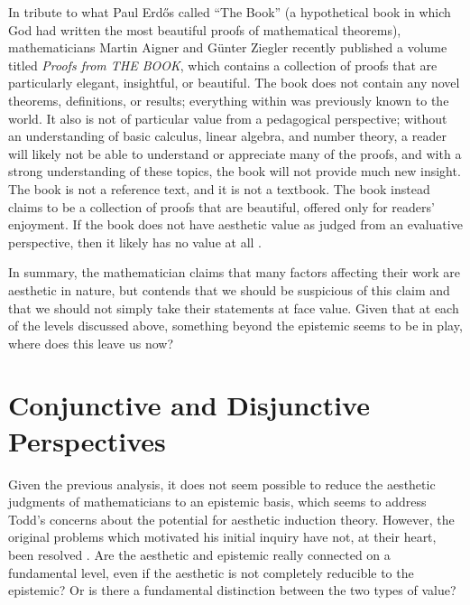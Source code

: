 \documentclass[a4paper,man,natbib]{apa6}
\begin{document}
In tribute to what Paul Erdős called ``The Book'' (a hypothetical book in which God had written the most beautiful proofs
of mathematical theorems), mathematicians Martin Aigner and Günter Ziegler recently published a volume titled \textit{Proofs 
from THE BOOK},
which contains a collection of proofs that are particularly elegant, insightful, or beautiful. The book does not contain
any novel theorems, definitions, or results; everything within was previously known to the world. It also is not of 
particular value
from a pedagogical perspective; without an understanding of basic calculus, linear algebra, and number theory, a reader 
will likely not be able to understand or appreciate many of the proofs, and with a strong understanding of these topics,
the book will not provide much new insight. The book is not a reference text, and it is not a textbook. The book instead
claims to be a collection of proofs that are beautiful, offered only for readers' enjoyment. If the book does not
have aesthetic value as judged from an evaluative perspective, then it likely has no value at all \citep{aigner1999proofs}.

In summary, the mathematician claims that many factors affecting their work are aesthetic in nature, but \cite{todd_unmasking_2008} 
contends that we should be suspicious of this claim and that we should not simply take their statements at face value. 
Given that at each of the levels discussed above, something beyond the epistemic seems to be in play, where does this 
leave us now?

\section{Conjunctive and Disjunctive Perspectives}

Given the previous analysis, it does not seem possible to reduce the aesthetic judgments of mathematicians to
an epistemic basis, which seems to address Todd's concerns about the potential for aesthetic induction
theory. However, the original problems which motivated his initial inquiry have not, at their heart, been 
resolved \citep{todd_unmasking_2008}. Are the aesthetic and epistemic really
connected on a fundamental level, even if the aesthetic is not completely reducible to the epistemic? Or is there
a fundamental distinction between the two types of value?
\end{document}
